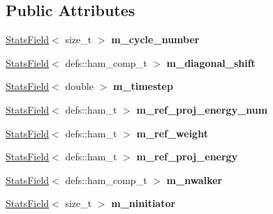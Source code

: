\subsection*{Public Attributes}
\begin{DoxyCompactItemize}
\item 
\hyperlink{classStatsField}{Stats\+Field}$<$ size\+\_\+t $>$ {\bfseries m\+\_\+cycle\+\_\+number}\hypertarget{structFciqmcStatsFile_a0e180ff5c99f2b80c50e7294b2e5b344}{}\label{structFciqmcStatsFile_a0e180ff5c99f2b80c50e7294b2e5b344}

\item 
\hyperlink{classStatsField}{Stats\+Field}$<$ defs\+::ham\+\_\+comp\+\_\+t $>$ {\bfseries m\+\_\+diagonal\+\_\+shift}\hypertarget{structFciqmcStatsFile_abf8839451047afbc3f78de5f9cb799a5}{}\label{structFciqmcStatsFile_abf8839451047afbc3f78de5f9cb799a5}

\item 
\hyperlink{classStatsField}{Stats\+Field}$<$ double $>$ {\bfseries m\+\_\+timestep}\hypertarget{structFciqmcStatsFile_a72fbd022cf32dcd1b8fe8e711cd91f58}{}\label{structFciqmcStatsFile_a72fbd022cf32dcd1b8fe8e711cd91f58}

\item 
\hyperlink{classStatsField}{Stats\+Field}$<$ defs\+::ham\+\_\+t $>$ {\bfseries m\+\_\+ref\+\_\+proj\+\_\+energy\+\_\+num}\hypertarget{structFciqmcStatsFile_a7f879a67c47ae9a82278e7c2b2e44876}{}\label{structFciqmcStatsFile_a7f879a67c47ae9a82278e7c2b2e44876}

\item 
\hyperlink{classStatsField}{Stats\+Field}$<$ defs\+::ham\+\_\+t $>$ {\bfseries m\+\_\+ref\+\_\+weight}\hypertarget{structFciqmcStatsFile_a90e6c05b9318afa4b5c6199856121342}{}\label{structFciqmcStatsFile_a90e6c05b9318afa4b5c6199856121342}

\item 
\hyperlink{classStatsField}{Stats\+Field}$<$ defs\+::ham\+\_\+t $>$ {\bfseries m\+\_\+ref\+\_\+proj\+\_\+energy}\hypertarget{structFciqmcStatsFile_abbb23c945569ceeec15e562b2f933ecd}{}\label{structFciqmcStatsFile_abbb23c945569ceeec15e562b2f933ecd}

\item 
\hyperlink{classStatsField}{Stats\+Field}$<$ defs\+::ham\+\_\+comp\+\_\+t $>$ {\bfseries m\+\_\+nwalker}\hypertarget{structFciqmcStatsFile_a749a51f565ba3224131003aea8619092}{}\label{structFciqmcStatsFile_a749a51f565ba3224131003aea8619092}

\item 
\hyperlink{classStatsField}{Stats\+Field}$<$ size\+\_\+t $>$ {\bfseries m\+\_\+ninitiator}\hypertarget{structFciqmcStatsFile_a12839d801fc75ae7ad1558fa2e56b9c2}{}\label{structFciqmcStatsFile_a12839d801fc75ae7ad1558fa2e56b9c2}


\end{DoxyCompactItemize}
